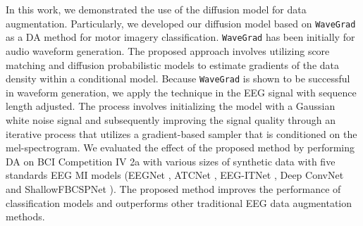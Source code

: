 In this work, we demonstrated the use of the diffusion model for data augmentation.
Particularly, we developed our diffusion model based on \texttt{WaveGrad} \cite{chen2020wavegrad} as a DA method for motor imagery classification.
\texttt{WaveGrad} has been initially for audio waveform generation.
The proposed approach involves utilizing score matching \cite{song2020sliced,song2020improved} and diffusion probabilistic \cite{sohl2015deep,ho2020denoising} models to estimate gradients of the data density within a conditional model. 
Because \texttt{WaveGrad} is shown to be successful in waveform generation, we apply the technique in the EEG signal with sequence length adjusted.
The process involves initializing the model with a Gaussian white noise signal and subsequently improving the signal quality through an iterative process that utilizes a gradient-based sampler that is conditioned on the mel-spectrogram.
We evaluated the effect of the proposed method by performing DA on BCI Competition IV 2a \cite{brunner2008bci} with various sizes of synthetic data with five standards EEG MI models (EEGNet \cite{lawhern2018eegnet}, ATCNet \cite{altaheri2022physics}, EEG-ITNet \cite{salami2022eeg}, Deep ConvNet \cite{schirrmeister2017deep} and ShallowFBCSPNet \cite{schirrmeister2017deep}). 
The proposed method improves the performance of classification models and outperforms other traditional EEG data augmentation methods. 

